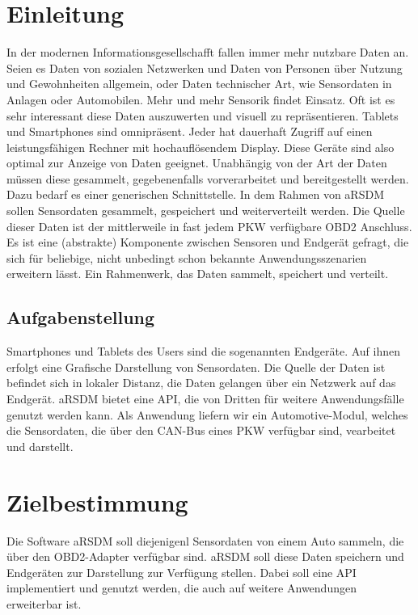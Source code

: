 \documentclass[pflichtenheft.tex]{subfiles}
\begin{document}
\chapter{Einleitung}

In der modernen Informationsgesellschafft fallen immer mehr nutzbare Daten an. Seien es Daten von sozialen Netzwerken und Daten von Personen über Nutzung und Gewohnheiten allgemein, oder Daten technischer Art, wie Sensordaten in Anlagen oder Automobilen. Mehr und mehr Sensorik findet Einsatz. Oft ist es sehr interessant diese Daten auszuwerten und visuell zu repräsentieren. Tablets und Smartphones sind omnipräsent. Jeder hat dauerhaft Zugriff auf einen leistungsfähigen Rechner mit hochauflösendem Display. Diese Geräte sind also optimal zur Anzeige von Daten geeignet. Unabhängig von der Art der Daten müssen diese gesammelt, gegebenenfalls vorverarbeitet und bereitgestellt werden. Dazu bedarf es einer generischen Schnittstelle. In dem Rahmen von aRSDM sollen Sensordaten gesammelt, gespeichert und weiterverteilt werden. Die Quelle dieser Daten ist der mittlerweile in fast jedem PKW verfügbare OBD2 Anschluss. Es ist eine (abstrakte) Komponente zwischen Sensoren und Endgerät gefragt, die sich für beliebige, nicht unbedingt schon bekannte Anwendungsszenarien erweitern lässt. Ein Rahmenwerk, das Daten sammelt, speichert und verteilt.

\section{Aufgabenstellung}

Smartphones und Tablets des Users sind die sogenannten Endgeräte. Auf ihnen erfolgt eine Grafische Darstellung von Sensordaten. Die Quelle der Daten ist befindet sich in lokaler Distanz, die Daten gelangen über ein Netzwerk auf das Endgerät. aRSDM bietet eine API, die von Dritten für weitere Anwendungsfälle genutzt werden kann. Als Anwendung liefern wir ein Automotive-Modul, welches die Sensordaten, die über den CAN-Bus eines PKW verfügbar sind, vearbeitet und darstellt.


\chapter{Zielbestimmung}

Die Software aRSDM soll diejenigenl Sensordaten von einem Auto sammeln, die über den OBD2-Adapter verfügbar sind. aRSDM soll diese Daten speichern und Endgeräten zur Darstellung zur Verfügung stellen. Dabei soll eine API implementiert und genutzt werden, die auch auf weitere Anwendungen erweiterbar ist.
\end{document}
